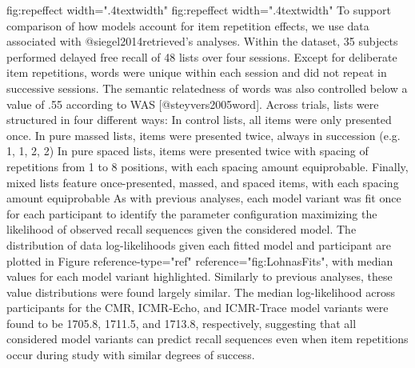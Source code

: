 {}\markdownRendererLeftBrace{}\markdownRendererHash{}fig:repeffect width=".4\markdownRendererBackslash{}textwidth"\markdownRendererRightBrace{} \markdownRendererLeftBrace{}\markdownRendererHash{}fig:repeffect width=".4\markdownRendererBackslash{}textwidth"\markdownRendererRightBrace{}\markdownRendererInterblockSeparator
{}\markdownRendererInterblockSeparator
{}To support comparison of how models account for item repetition effects, we use data associated with @siegel2014retrieved's analyses. Within the dataset, 35 subjects performed delayed free recall of 48 lists over four sessions. Except for deliberate item repetitions, words were unique within each session and did not repeat in successive sessions. The semantic relatedness of words was also controlled below a value of .55 according to WAS [@steyvers2005word]. Across trials, lists were structured in four different ways:\markdownRendererInterblockSeparator
{}\markdownRendererOlBegin
{}In control lists, all items were only presented once.\markdownRendererOlItemEnd 
{}In pure massed lists, items were presented twice, always in succession (e.g. 1, 1, 2, 2)\markdownRendererOlItemEnd 
{}In pure spaced lists, items were presented twice with spacing of repetitions from 1 to 8 positions, with each spacing amount equiprobable.\markdownRendererOlItemEnd 
{}Finally, mixed lists feature once-presented, massed, and spaced items, with each spacing amount equiprobable\markdownRendererOlItemEnd 
\markdownRendererOlEnd \markdownRendererInterblockSeparator
{}As with previous analyses, each model variant was fit once for each participant to identify the parameter configuration maximizing the likelihood of observed recall sequences given the considered model. The distribution of data log-likelihoods given each fitted model and participant are plotted in Figure \markdownRendererLeftBrace{}reference-type="ref" reference="fig:LohnasFits"\markdownRendererRightBrace{}, with median values for each model variant highlighted. Similarly to previous analyses, these value distributions were found largely similar. The median log-likelihood across participants for the CMR, ICMR-Echo, and ICMR-Trace model variants were found to be 1705.8, 1711.5, and 1713.8, respectively, suggesting that all considered model variants can predict recall sequences even when item repetitions occur during study with similar degrees of success.\markdownRendererInterblockSeparator
